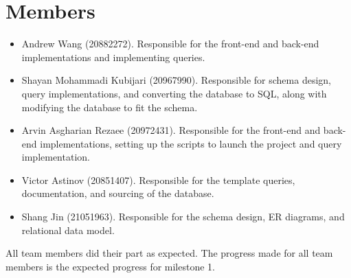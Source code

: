 \documentclass[11pt]{article}
\begin{document}
\section{Members}
\begin{itemize}
    \item Andrew Wang (20882272). Responsible for the front-end and back-end implementations and implementing queries.
    \item Shayan Mohammadi Kubijari (20967990). Responsible for schema design, query implementations, and converting the database to SQL, along with modifying the database to fit the schema.
    \item Arvin Asgharian Rezaee (20972431). Responsible for the front-end and back-end implementations, setting up the scripts to launch the project and query implementation.
    \item Victor Astinov (20851407). Responsible for the template queries, documentation, and sourcing of the database.
    \item Shang Jin (21051963). Responsible for the schema design, ER diagrams, and relational data model.
\end{itemize}

All team members did their part as expected. The progress made for all team members is the expected progress for milestone 1.
\end{document}
